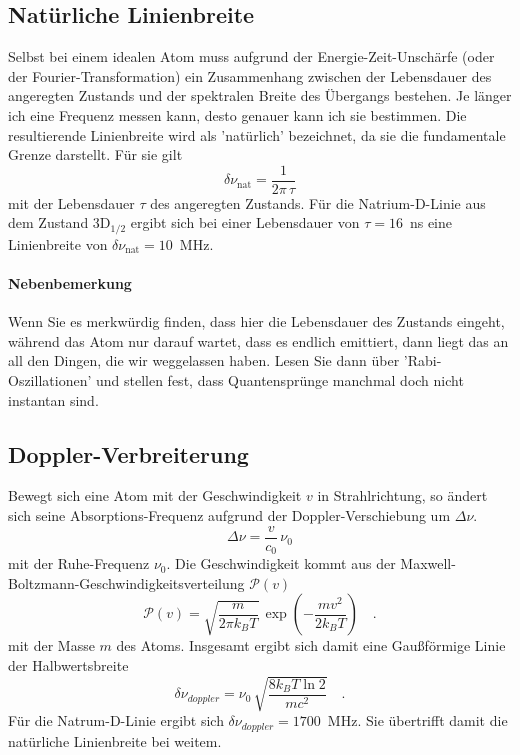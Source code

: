 \subsection{Natürliche Linienbreite} 

Selbst bei einem idealen Atom muss aufgrund der Energie-Zeit-Unschärfe (oder der Fourier-Transformation) ein Zusammenhang zwischen der Lebensdauer des angeregten Zustands und der spektralen Breite des Übergangs bestehen. Je länger ich eine Frequenz messen kann, desto genauer kann ich sie bestimmen. Die resultierende Linienbreite wird als 'natürlich' bezeichnet, da sie die fundamentale Grenze darstellt. Für sie gilt
\begin{equation}
    \delta \nu_\text{nat} = \frac{1}{2\pi \, \tau}
\end{equation}
mit der Lebensdauer $\tau$ des angeregten Zustands. Für die Natrium-D-Linie aus dem Zustand 3D$_{1/2}$ ergibt sich bei einer Lebensdauer von $\tau = 16$~ns eine Linienbreite von $\delta \nu_\text{nat} = 10$~MHz.

\paragraph{Nebenbemerkung} Wenn Sie es merkwürdig finden, dass hier die Lebensdauer des Zustands eingeht, während das Atom nur darauf wartet, dass es endlich emittiert, dann liegt das an all den Dingen, die wir weggelassen haben. Lesen Sie dann über  'Rabi-Oszillationen' und stellen fest, dass Quantensprünge manchmal doch nicht instantan sind.


\subsection{Doppler-Verbreiterung}


Bewegt sich eine Atom mit der Geschwindigkeit  $v$ in Strahlrichtung, so ändert sich seine Absorptions-Frequenz aufgrund der Doppler-Verschiebung um $\Delta \nu$.
\begin{equation}
	\Delta \nu = \frac{v}{c_0} \, \nu_0
\end{equation}
mit der Ruhe-Frequenz $\nu_0$. Die Geschwindigkeit kommt  aus der  Maxwell-Boltzmann-Geschwindigkeitsverteilung $\mathcal{P}(v)$
\begin{equation}
	\mathcal{P}(v) = \sqrt{\frac{m}{2 \pi k_B T}} \, \exp \left (
	- \frac{m v^2}{2  k_B T}	
	\right) \quad .
\end{equation}
mit der Masse $m$ des Atoms.
Insgesamt ergibt sich damit eine Gaußförmige  Linie der Halbwertsbreite 
\begin{equation}
	 \delta \nu_{doppler} = \nu_0 \, \sqrt{\frac{8 k_B T \ln 2} {m c^2}} \quad .
\end{equation}
Für die Natrum-D-Linie ergibt sich  $\delta \nu_{doppler} = 1 700$~MHz. Sie übertrifft damit die natürliche Linienbreite bei weitem.

